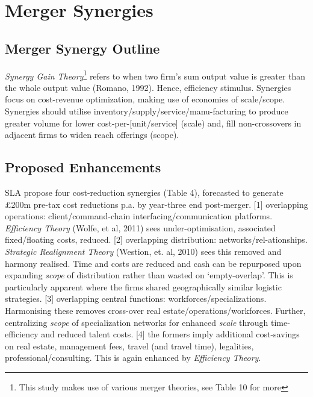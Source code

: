 \documentclass[11pt, english]{article}
\begin{document}
\newpage

\section{Merger Synergies}

	\subsection{Merger Synergy Outline}

\textit{Synergy Gain Theory}\footnote{This study makes use of various merger theories, see Table 10 for more} refers to when two firm's sum output value is greater than the whole output value (Romano, 1992). Hence, efficiency stimulus. Synergies focus on cost-revenue optimization, making use of economies of scale/scope. Synergies should utilise inventory/supply/service/manu-facturing to produce greater volume for lower cost-per-[unit/service] (scale) and, fill non-crossovers in adjacent firms to widen reach offerings (scope).

	\subsection{Proposed Enhancements}

SLA propose four cost-reduction synergies (Table 4), forecasted to generate \pounds200m pre-tax cost reductions p.a. by year-three end post-merger. [1] overlapping operations: client/command-chain interfacing/communication platforms. \textit{Efficiency Theory} (Wolfe, et al, 2011) sees under-optimisation, associated fixed/floating costs, reduced. [2] overlapping distribution: networks/rel-ationships. \textit{Strategic Realignment Theory} (Westion, et. al, 2010) sees this removed and harmony realised. Time and costs are reduced and cash can be repurposed upon expanding \textit{scope} of distribution rather than wasted on `empty-overlap'. This is particularly apparent where the firms shared geographically similar logistic strategies. [3] overlapping central functions: workforces/specializations. Harmonising these removes cross-over real estate/operations/workforces. Further, centralizing \textit{scope} of specialization networks for enhanced \textit{scale} through time-efficiency and reduced talent costs. [4] the formers imply additional cost-savings on real estate, management fees, travel (and travel time), legalities, professional/consulting. This is again enhanced by \textit{Efficiency Theory}.\\
\end{document}
